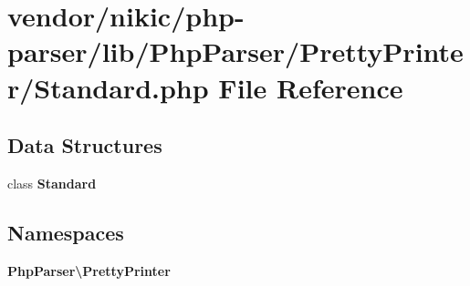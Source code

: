 \section{vendor/nikic/php-\/parser/lib/\+Php\+Parser/\+Pretty\+Printer/\+Standard.php File Reference}
\label{_standard_8php}
\subsection*{Data Structures}
\begin{DoxyCompactItemize}
\item 
class {\bf Standard}
\end{DoxyCompactItemize}
\subsection*{Namespaces}
\begin{DoxyCompactItemize}
\item 
 {\bf Php\+Parser\textbackslash{}\+Pretty\+Printer}
\end{DoxyCompactItemize}
